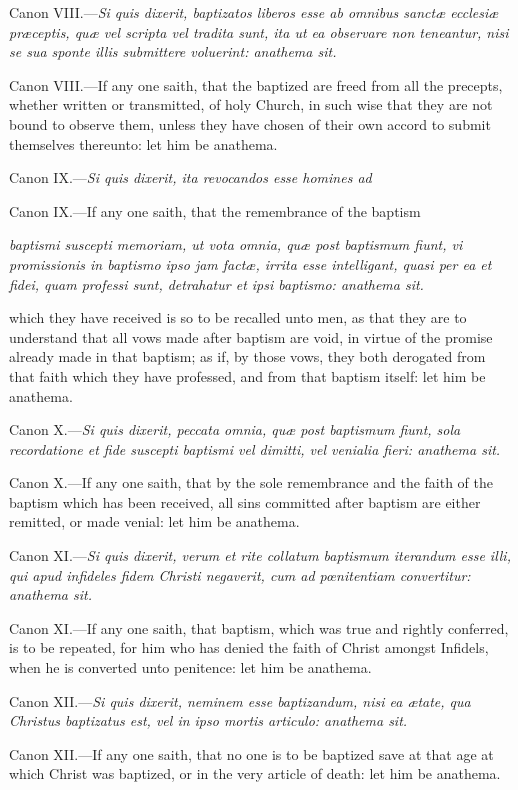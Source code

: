 Canon VIII.—\emph{Si quis dixerit, baptizatos liberos esse ab omnibus sanctæ ecclesiæ præceptis, quæ vel scripta vel tradita sunt, ita ut ea observare non teneantur, nisi se sua sponte illis submittere voluerint: anathema sit.}

Canon VIII.—If any one saith, that the baptized are freed from all the precepts, whether written or transmitted, of holy Church, in such wise that they are not bound to observe them, unless they have chosen of their own accord to submit themselves thereunto: let him be anathema.

Canon IX.—\emph{Si quis dixerit, ita revocandos esse homines ad }

Canon IX.—If any one saith, that the remembrance of the baptism

\emph{baptismi suscepti memoriam, ut vota omnia, quæ post baptismum fiunt, vi promissionis in baptismo ipso jam factæ, irrita esse intelligant, quasi per ea et fidei, quam professi sunt, detrahatur et ipsi baptismo: anathema sit.}

which they have received is so to be recalled unto men, as that they are to understand that all vows made after baptism are void, in virtue of the promise already made in that baptism; as if, by those vows, they both derogated from that faith which they have professed, and from that baptism itself: let him be anathema.

Canon X.—\emph{Si quis dixerit, peccata omnia, quæ post baptismum fiunt, sola recordatione et fide suscepti baptismi vel dimitti, vel venialia fieri: anathema sit.}

Canon X.—If any one saith, that by the sole remembrance and the faith of the baptism which has been received, all sins committed after baptism are either remitted, or made venial: let him be anathema.

Canon XI.—\emph{Si quis dixerit, verum et rite collatum baptismum iterandum esse illi, qui apud infideles fidem Christi negaverit, cum ad pœnitentiam convertitur: anathema sit.}

Canon XI.—If any one saith, that baptism, which was true and rightly conferred, is to be repeated, for him who has denied the faith of Christ amongst Infidels, when he is converted unto penitence: let him be anathema.

Canon XII.—\emph{Si quis dixerit, neminem esse baptizandum, nisi ea ætate, qua Christus baptizatus est, vel in ipso mortis articulo: anathema sit.}

Canon XII.—If any one saith, that no one is to be baptized save at that age at which Christ was baptized, or in the very article of death: let him be anathema.

